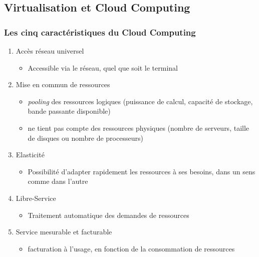 \subsection{Virtualisation et Cloud Computing}

\begin{frame}
\frametitle{Les cinq caractéristiques du Cloud Computing \cite{intro-cloud}}
\begin{enumerate}
\item <1>Accès réseau universel
\begin{itemize}
\item Accessible via le réseau, quel que soit le terminal
\end{itemize}
\item <2>Mise en commun de ressources
\begin{itemize}
\item \textit{pooling} des ressources logiques (puissance de calcul, capacité de stockage, bande passante disponible)
\item ne tient pas compte des ressources physiques (nombre de serveurs, taille de disques ou nombre de processeurs)
\end{itemize}
\item <3>Elasticité
\begin{itemize}
\item Possibilité d'adapter rapidement les ressources à ses besoins, dans un sens comme dans l'autre
\end{itemize}
\item <4>Libre-Service
\begin{itemize}
\item Traitement automatique des demandes de ressources
\end{itemize}
\item <5>Service mesurable et facturable
\begin{itemize}
\item facturation à l'usage, en fonction de la consommation de ressources
\end{itemize}
\end{enumerate}
\end{frame}

